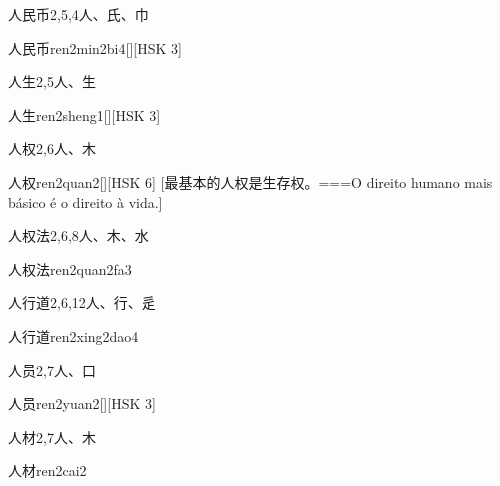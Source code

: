 \begin{Entry}{人民币}{2,5,4}{⼈、⽒、⼱}
  \begin{Phonetics}{人民币}{ren2min2bi4}[][HSK 3]
  \end{Phonetics}
\end{Entry}

\begin{Entry}{人生}{2,5}{⼈、⽣}
  \begin{Phonetics}{人生}{ren2sheng1}[][HSK 3]
  \end{Phonetics}
\end{Entry}

\begin{Entry}{人权}{2,6}{⼈、⽊}
  \begin{Phonetics}{人权}{ren2quan2}[][HSK 6]
    [最基本的人权是生存权。===O direito humano mais básico é o direito à vida.]
  \end{Phonetics}
\end{Entry}

\begin{Entry}{人权法}{2,6,8}{⼈、⽊、⽔}
  \begin{Phonetics}{人权法}{ren2quan2fa3}
  \end{Phonetics}
\end{Entry}

\begin{Entry}{人行道}{2,6,12}{⼈、⾏、⾡}
  \begin{Phonetics}{人行道}{ren2xing2dao4}
  \end{Phonetics}
\end{Entry}

\begin{Entry}{人员}{2,7}{⼈、⼝}
  \begin{Phonetics}{人员}{ren2yuan2}[][HSK 3]
  \end{Phonetics}
\end{Entry}

\begin{Entry}{人材}{2,7}{⼈、⽊}
  \begin{Phonetics}{人材}{ren2cai2}
  \end{Phonetics}
\end{Entry}

